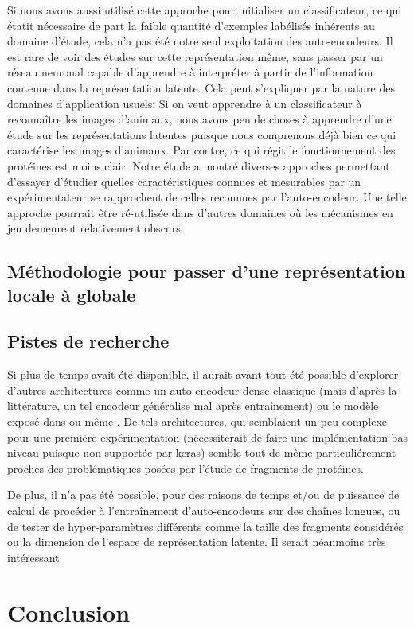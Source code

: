 \documentclass[a4paper, 11pt, onecolumn]{article}
\begin{document}
Si nous avons aussi utilisé cette approche pour initialiser un classificateur,
ce qui étatit nécessaire de part la faible quantité d'exemples labélisés
inhérents au domaine d'étude, cela n'a pas été notre seul exploitation des
auto-encodeurs. Il est rare de voir des études sur cette représentation même,
sans passer par un réseau neuronal capable d'apprendre à interpréter à partir de
l'information contenue dans la représentation latente. Cela peut s'expliquer par
la nature des domaines d'application usuels: Si on veut apprendre à un
classificateur à reconnaître les images d'animaux, nous avons peu de choses à
apprendre d'une étude sur les représentations latentes puisque nous comprenons
déjà bien ce qui caractérise les images d'animaux. Par contre, ce qui régit le
fonctionnement des protéines est moins clair. Notre étude a montré diverses
approches permettant d'essayer d'étudier quelles caractéristiques connues et
mesurables par un expérimentateur se rapprochent de celles reconnues par
l'auto-encodeur. Une telle approche pourrait être ré-utilisée dans d'autres
domaines où les mécanismes en jeu demeurent relativement obscurs.

\subsection{Méthodologie pour passer d'une représentation locale à globale}



\subsection{Pistes de recherche}

Si plus de temps avait été disponible, il aurait avant tout été possible
d'explorer d'autres architectures comme un auto-encodeur dense classique (mais
d'après la littérature, un tel encodeur généralise mal après entraînement) ou
le modèle exposé dans \cite{DBLP:journals/corr/ChoMGBSB14} ou même
\cite{bahdanau2014neural}. De tels architectures, qui semblaient un peu complexe
pour une première expérimentation (nécessiterait de faire une implémentation bas
niveau puisque non supportée par keras) semble tout de même particuliérement
proches des problématiques posées par l'étude de fragments de protéines.

De plus, il n'a pas été possible, pour des raisons de temps et/ou de puissance
de calcul de procéder à l'entraînement d'auto-encodeurs sur des chaînes longues,
ou de tester de hyper-paramètres différents comme la taille des fragments
considérés ou la dimension de l'espace de représentation latente. Il serait
néanmoins très intéressant

\section*{Conclusion}

\printbibliography
\end{document}

